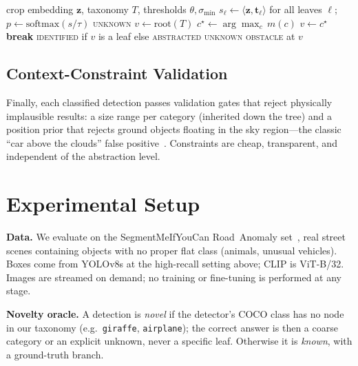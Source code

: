 \documentclass[conference]{IEEEtran}
\begin{document}
\begin{algorithm}[t]
\caption{Hierarchical abstraction with safety floor}
\label{alg:descent}
\begin{algorithmic}[1]
\REQUIRE crop embedding $\mathbf{z}$, taxonomy $T$, thresholds $\theta,\sigma_{\min}$
\STATE $s_\ell \gets \langle\mathbf{z},\mathbf{t}_\ell\rangle$ for all leaves $\ell$;\quad
       $p \gets \mathrm{softmax}(s/\tau)$
    \RETURN \textsc{unknown} 
\ENDIF
\STATE $v \gets \mathrm{root}(T)$
    \STATE $c^\star \gets \arg\max_{c}\, m(c)$ 
        \STATE $v \gets c^\star$
    \ELSE
        \STATE \textbf{break} 
    \ENDIF
\ENDWHILE
{}
    \RETURN \textsc{identified} if $v$ is a leaf else \textsc{abstracted}
\ELSE
    \RETURN \textsc{unknown obstacle} at $v$
\ENDIF
\end{algorithmic}
\end{algorithm}

\subsection{Context-Constraint Validation}
Finally, each classified detection passes validation gates that reject
physically implausible results: a size range per category (inherited down the
tree) and a position prior that rejects ground objects floating in the sky
region---the classic ``car above the clouds'' false positive~\cite{schaller2025}.
Constraints are cheap, transparent, and independent of the abstraction level.

\section{Experimental Setup}
\label{sec:setup}

\textbf{Data.} We evaluate on the SegmentMeIfYouCan Road~Anomaly
set~\cite{chan2021}, real street scenes containing objects with no proper flat
class (animals, unusual vehicles). Boxes come from YOLOv8s at the high-recall
setting above; CLIP is ViT-B/32. Images are streamed on demand; no training or
fine-tuning is performed at any stage.

\textbf{Novelty oracle.} A detection is \emph{novel} if the detector's COCO class
has no node in our taxonomy (e.g.\ \texttt{giraffe}, \texttt{airplane}); the
correct answer is then a coarse category or an explicit unknown, never a specific
leaf. Otherwise it is \emph{known}, with a ground-truth branch.
\end{document}
